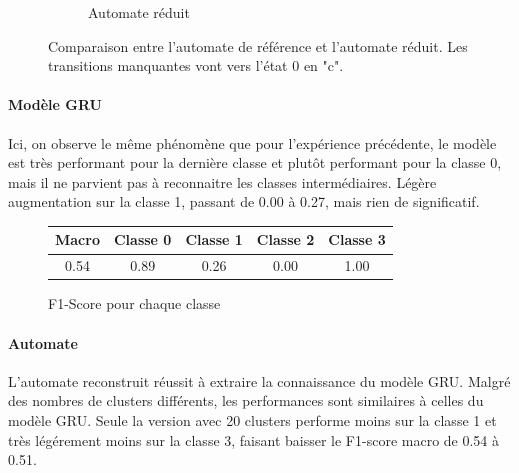 \documentclass{article}
\begin{document}
\begin{figure}[ht]
\begin{subfigure}{0.45\textwidth}
{
        }
    \caption{Automate réduit}
    \label{fig:reduced-chevauchement}
    \end{subfigure}
    \caption{Comparaison entre l'automate de référence et l'automate réduit. Les transitions manquantes vont vers l'état 0 en "c".}
    \label{fig:auto-chevauchement}
\end{figure}




\paragraph{Modèle GRU} Ici, on observe le même phénomène que pour l'expérience précédente, le modèle est très performant pour la
dernière classe et plutôt performant pour la classe 0, mais il ne parvient pas à reconnaitre les classes intermédiaires.
Légère augmentation sur la classe 1, passant de 0.00 à 0.27, mais rien de significatif.

\begin{figure}[ht]
    \centering
    \begin{tabular}{|c|c|c|c|c|}
        \hline
        Macro & Classe 0 & Classe 1 & Classe 2 & Classe 3 \\
        \hline
        0.54 & 0.89 & 0.26 & 0.00 & 1.00 \\
        \hline
    \end{tabular}
    \caption{F1-Score pour chaque classe}
    \label{tab:f1-chevauchement}
\end{figure}

\paragraph{Automate} L'automate reconstruit réussit à extraire la connaissance du modèle GRU. Malgré des nombres de clusters
différents, les performances sont similaires à celles du modèle GRU. Seule la version avec 20 clusters performe moins sur la
classe 1 et très légérement moins sur la classe 3, faisant baisser le F1-score macro de 0.54 à 0.51.
\end{document}
